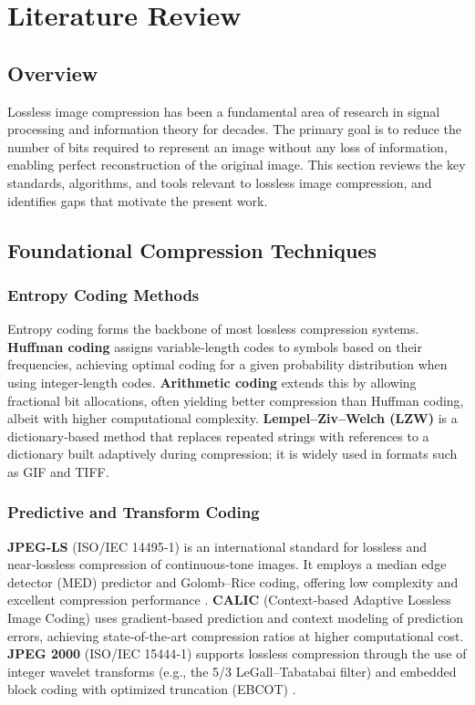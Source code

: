 \section{Literature Review}

\subsection{Overview}

Lossless image compression has been a fundamental area of research in signal processing and information theory for decades. The primary goal is to reduce the number of bits required to represent an image without any loss of information, enabling perfect reconstruction of the original image. This section reviews the key standards, algorithms, and tools relevant to lossless image compression, and identifies gaps that motivate the present work.

\subsection{Foundational Compression Techniques}

\subsubsection{Entropy Coding Methods}

Entropy coding forms the backbone of most lossless compression systems. \textbf{Huffman coding} \cite{Huffman1952} assigns variable‑length codes to symbols based on their frequencies, achieving optimal coding for a given probability distribution when using integer‑length codes. \textbf{Arithmetic coding} \cite{Witten1987} extends this by allowing fractional bit allocations, often yielding better compression than Huffman coding, albeit with higher computational complexity. \textbf{Lempel–Ziv–Welch (LZW)} \cite{Welch1984} is a dictionary‑based method that replaces repeated strings with references to a dictionary built adaptively during compression; it is widely used in formats such as GIF and TIFF.

\subsubsection{Predictive and Transform Coding}

\textbf{JPEG‑LS} (ISO/IEC 14495‑1) is an international standard for lossless and near‑lossless compression of continuous‑tone images. It employs a median edge detector (MED) predictor and Golomb–Rice coding, offering low complexity and excellent compression performance \cite{Weinberger1996}. \textbf{CALIC} (Context‑based Adaptive Lossless Image Coding) \cite{Wu1996} uses gradient‑based prediction and context modeling of prediction errors, achieving state‑of‑the‑art compression ratios at higher computational cost. \textbf{JPEG 2000} (ISO/IEC 15444‑1) supports lossless compression through the use of integer wavelet transforms (e.g., the 5/3 LeGall–Tabatabai filter) and embedded block coding with optimized truncation (EBCOT) \cite{Bhaskaran1995}.

